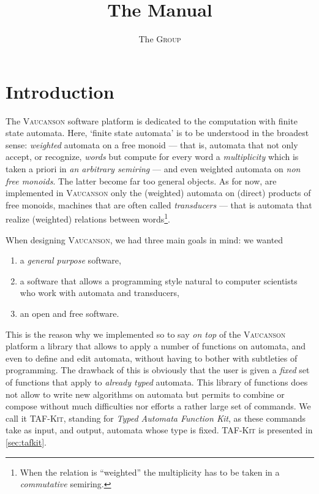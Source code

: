 \documentclass[a4paper]{report}
\title{The \Vauc \TFKv Manual}
\author{The \Vauc \textsc{Group}}
\date{\VcsnDate}
\newcommand{\tafkit}{\textsc{TAF-Kit}\xspace}
\newcommand{\Vauc}{\textsc{Vaucanson}\xspace}
\begin{document}
\maketitle

\setcounter{tocdepth}{2}
\tableofcontents

\chapter*{Introduction}
\label{sec:intro}

The \Vauc software platform is dedicated to the computation with
finite state automata.  Here, `finite state automata' is to be
understood in the broadest sense: \emph{weighted} automata on a free
monoid --- that is, automata that not only accept, or recognize,
\emph{words} but compute for every word a \emph{multiplicity} which is
taken a priori in \emph{an arbitrary semiring} --- and even weighted
automata on \emph{non free monoids}.  The latter become far too
general objects.  As for now, are implemented in \Vauc only the
(weighted) automata on (direct) products of free monoids, machines
that are often called \emph{transducers} --- that is automata that
realize (weighted) relations between words\footnote{When the relation
  is ``weighted'' the multiplicity has to be taken in a
  \emph{commutative} semiring.}.

When designing \Vauc, we had three main goals in mind: we wanted
\begin{enumerate}
\item a \emph{general purpose} software,
\item a software that allows a programming style natural to computer
  scientists who work with automata and transducers,
\item  an open and free software.
\end{enumerate}

This is the reason why we implemented so to say \emph{on top} of the
\Vauc platform a library that allows to apply a number of functions on
automata, and even to define and edit automata, without having to
bother with subtleties of \Cxx programming.  The drawback of this is
obviously that the user is given a \emph{fixed} set of functions that
apply to \emph{already typed} automata.  This library of functions
does not allow to write new algorithms on automata but permits to
combine or compose without much difficulties nor efforts a rather
large set of commands.  We call it \tafkit, standing for \emph{Typed
  Automata Function Kit}, as these commands take as input, and output,
automata whose type is fixed.  \tafkit is presented in
\autoref{sec:tafkit}.
\end{document}
